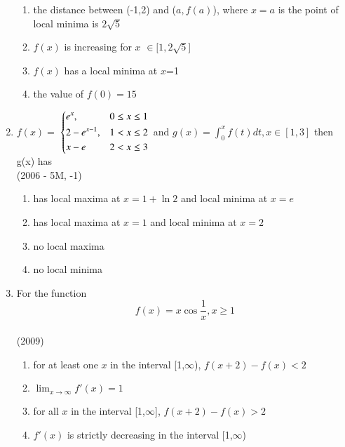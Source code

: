 \documentclass[journal,12pt,twocolumn]{IEEEtran}
\theoremstyle{remark}
\begin{document}
\begin{enumerate}
{            \begin{enumerate}
                \item the distance between (-1,2) and ($a,f(a)$), where $x=a$ is the point of local minima is $2\sqrt{5}$
                \item $f(x)$ is increasing for $x$ $\in [1,2\sqrt{5}$]
                \item $f(x)$ has a local minima at $x$=1
                \item the value of $f(0)=15$
            \end{enumerate}
        
        }
    \item{
        
            $f(x) = $    
            $\begin{dcases}%
                e^x, & 0 \leq x\leq 1 \\
                2-e^{x-1}, & 1 < x\leq 2 \\
                x-e & 2 < x\leq 3 \\
            \end{dcases}$ and $g(x) = \int_0^{x}f(t)dt, x \in[1,3]$ then g(x) has
            \\ \text{   } \hfill
                {(2006 - 5M, -1)}
            
            \begin{enumerate}
                \item has local maxima at $x = 1+ \ln{2}$ and local minima at $x = e$
                \item has local maxima at $x = 1$ and local minima at $x = 2$
                \item no local maxima
                \item no local minima
            \end{enumerate}
        
        }
    \item{
        
            For the function $$f(x) = x\cos{\frac{1}{x}}, x\geq1$$
            \\ \text{   } \hfill
                {(2009)}
            
            \begin{enumerate}
                \item for at least one $x$ in the interval [1,$\infty$), $f(x+2)-f(x)<2$
                \item $\lim_{x\to\infty} f'(x) = 1$
                \item for all $x$ in the interval [1,$\infty$], $f(x+2)-f(x)>2$
                \item $f'(x)$ is strictly decreasing in the interval [1,$\infty$)
            \end{enumerate}
        
}
\end{enumerate}
\end{document}
